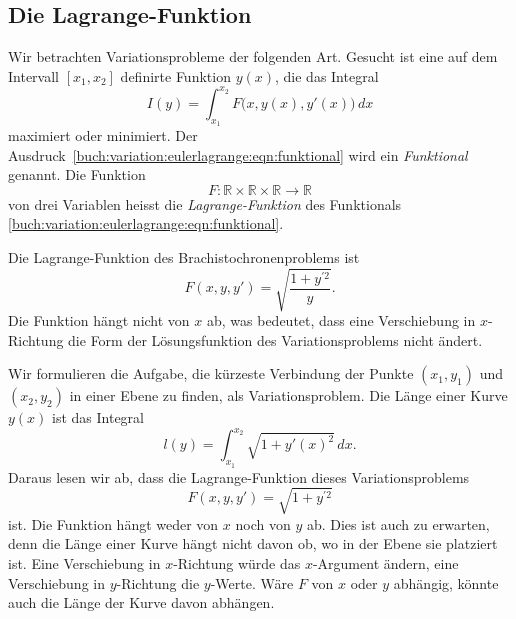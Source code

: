 %
%
%

%
%
\subsection{Die Lagrange-Funktion
\label{buch:variation:eulerlagrange:subsection:lagrange-funktion}}
Wir betrachten Variationsprobleme der folgenden Art.
Gesucht ist eine auf dem Intervall $[x_1,x_2]$ definirte
Funktion $y(x)$, die das Integral
\begin{equation}
I(y)
=
\int_{x_1}^{x_2}
F\bigl(x, y(x), y'(x)\bigr)
\,dx
\label{buch:variation:eulerlagrange:eqn:funktional}
\end{equation}
maximiert oder minimiert.
Der Ausdruck~\eqref{buch:variation:eulerlagrange:eqn:funktional}
wird ein {\em Funktional} genannt.
%
Die Funktion
\[
F
\colon
\mathbb{R}\times
\mathbb{R}\times
\mathbb{R}
\to
\mathbb{R}
\]
von drei Variablen heisst die {\em Lagrange-Funktion}
des Funktionals \eqref{buch:variation:eulerlagrange:eqn:funktional}.

\begin{beispiel}
Die Lagrange-Funktion des Brachistochronenproblems ist
\[
F(x,y,y')
=
\sqrt{ \frac{1+y^{\prime 2}}{y} }.
\]
Die Funktion hängt nicht von $x$ ab, was bedeutet, dass eine
Verschiebung in $x$-Richtung die Form der Lösungsfunktion des
Variationsproblems nicht ändert.
\end{beispiel}

\begin{beispiel}
\label{buch:variation:eulerlagrange:beispiel:gerade}
Wir formulieren die Aufgabe, die kürzeste Verbindung der Punkte
$(x_1,y_1)$ und $(x_2,y_2)$ in einer Ebene zu finden, als Variationsproblem.
Die Länge einer Kurve $y(x)$ ist das Integral
\[
l(y)
=
\int_{x_1}^{x_2}
\sqrt{1+y'(x)^2}\,dx.
\]
Daraus lesen wir ab, dass die Lagrange-Funktion dieses Variationsproblems
\begin{equation}
F(x,y,y') = \sqrt{1+y^{\prime 2}}
\label{buch:variation:eulerlagrange:eqn:geradeL}
\end{equation}
ist.
Die Funktion hängt weder von $x$ noch von $y$ ab.
Dies ist auch zu erwarten, denn die Länge einer Kurve hängt nicht davon
ob, wo in der Ebene sie platziert ist.
Eine Verschiebung in $x$-Richtung würde das $x$-Argument ändern,
eine Verschiebung in $y$-Richtung die $y$-Werte.
Wäre $F$ von $x$ oder $y$ abhängig, könnte auch die Länge der Kurve
davon abhängen.
\end{beispiel}

